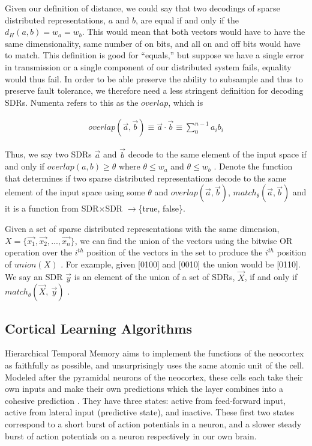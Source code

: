 \documentclass[oneside,12pt,openany]{book}
\begin{document}
	Given our definition of distance, we could say that two decodings of sparse distributed representations, $a$ and $b$, are equal if and only if the $d_{H}(a,b) = w_{a} = w_{b}$. This would mean that both vectors would have to have the same dimensionality, same number of on bits, and all on and off bits would have to match. This definition is good for ``equals,'' but suppose we have a single error in transmission or a single component of our distributed system fails, equality would thus fail. In order to be able preserve the ability to subsample and thus to preserve fault tolerance, we therefore need a less stringent definition for decoding SDRs. Numenta refers to this as the $overlap$, which is 
	
	\begin{align}
	\label{eqn:overlap}
		overlap(\overrightarrow{a}, \overrightarrow{b}) \equiv \overrightarrow{a} \cdot \overrightarrow{b} \equiv \sum_{0}^{n-1} a_{i}b_{i}
	\end{align}
	
	
	 Thus, we say two SDRs $\overrightarrow{a}$ and $\overrightarrow{b}$ decode to the same element of the input space if and only if $overlap(a,b) \geq \theta$ where $\theta \leq w_{a}$ and $\theta \leq w_{b}$ \cite{Properties}. Denote the function that determines if two sparse distributed representations decode to the same element of the input space using some $\theta$ and $overlap(\overrightarrow{a}, \overrightarrow{b})$, $match_{\theta}(\overrightarrow{a}, \overrightarrow{b})$ and it is a function from SDR$\times$SDR $\longrightarrow$\{true, false\}.
	
	Given a set of sparse distributed representations with the same dimension, $X =\{\overrightarrow{x_{1}}, \overrightarrow{x_{2}}, ...,\overrightarrow{x_{n}}\}$, we can find the union of the vectors using the bitwise OR operation over the $i^{th}$ position of the vectors in the set to produce the $i^{th}$ position of $union(X)$ \cite{Properties}. For example, given [0100] and [0010] the union would be [0110]. We say an SDR $\overrightarrow{y}$ is an element of the union of a set of SDRs, $\overrightarrow{X}$, if and only if $match_{\theta}(\overrightarrow{X},\ \overrightarrow{y})$ \cite{Properties}.
	
	\subsection{Cortical Learning Algorithms}
	
	Hierarchical Temporal Memory aims to implement the functions of the neocortex as faithfully as possible, and unsurprisingly uses the same atomic unit of the cell. Modeled after the pyramidal neurons of the neocortex, these cells each take their own inputs and make their own predictions which the layer combines into a cohesive prediction \cite{Whitepaper}. They have three states: active from feed-forward input, active from lateral input (predictive state), and inactive. These first two states correspond to a short burst of action potentials in a neuron, and a slower steady burst of action potentials on a neuron respectively in our own brain.
	
\end{document}
